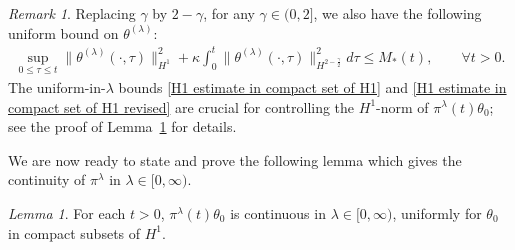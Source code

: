\documentclass[reqno]{amsart}%
\theoremstyle{definition}
\theoremstyle{remark}
\numberwithin{equation}{section}
\newtheorem{lemma}[theorem]{Lemma}
\newtheorem{remark}[theorem]{Remark}
\newcommand{\thetalambda}{\theta^{(\lambda)}}
\newcommand{\1}{\mathbf{1}}
\newcommand{\pin}{\pi^{\lambda}}
\numberwithin{equation}{section}
\numberwithin{theorem}{section}
\numberwithin{figure}{section}
\begin{document}
\begin{remark}
Replacing $\gamma$ by $2-\gamma$, for any $\gamma\in(0,2]$, we also have the following uniform bound on $\thetalambda$:
\begin{align}\label{H1 estimate in compact set of H1 revised}
\sup_{0\le \tau\le t}\|\thetalambda(\cdot,\tau)\|^2_{H^1}+\kappa\int_0^t\|\thetalambda(\cdot,\tau)\|_{H^{2-\frac{\gamma}{2}}}^2d\tau\le M_*(t),\qquad\forall t>0.
\end{align}
The uniform-in-$\lambda$ bounds  \eqref{H1 estimate in compact set of H1} and \eqref{H1 estimate in compact set of H1 revised} are crucial for controlling the $H^1$-norm of $\pin(t)\theta_0$; see the proof of Lemma~\ref{continuity in nu lemma} for details.
\end{remark}

We are now ready to state and prove the following lemma which gives the continuity of $\pin$ in $\lambda\in[0,\infty)$.

\begin{lemma}\label{continuity in nu lemma}
For each $t > 0$, $\pin(t)\theta_0$ is continuous in $\lambda\in[0,\infty)$, uniformly for $\theta_0$ in compact subsets of $H^1$.
\end{lemma}
\end{document}
